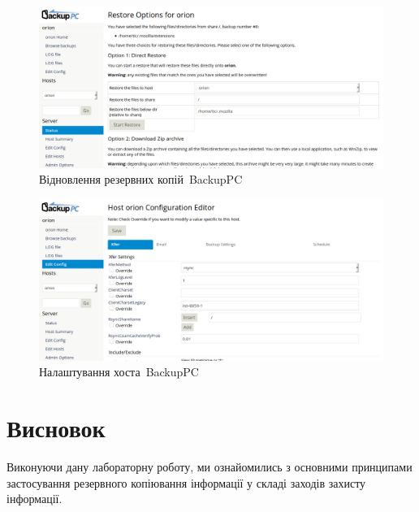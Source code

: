 \documentclass[
	a4paper,
	oneside,
	BCOR = 10mm,
	DIV = 12,
	12pt,
	headings = normal,
]{scrartcl}
\begin{document}
			\begin{figure}[!htbp]
				\centering
				\includegraphics[height=9\baselineskip]{./assets/y04s01-infosec-lab-01-03-p23.png}
				\caption{Відновлення резервних копій~\textenglish{BackupPC}}
				\label{fig:04-backuppc-01-04}
			\end{figure}

			\begin{figure}[!htbp]
				\centering
				\includegraphics[height=9\baselineskip]{./assets/y04s01-infosec-lab-01-03-p24.png}
				\caption{Налаштування хоста~\textenglish{BackupPC}}
				\label{fig:04-backuppc-01-05}
			\end{figure}

	\section{Висновок}
		Виконуючи дану лабораторну роботу, ми ознайомились з основними принципами застосування резервного копіювання інформації у складі заходів захисту інформації.
\end{document}
